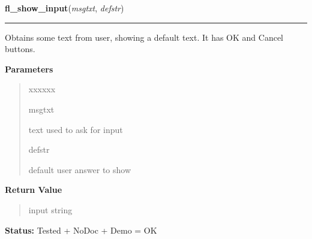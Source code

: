     \label{xformslib:flgoodies:fl_show_input}

    \vspace{0.5ex}

\hspace{.8\funcindent}\begin{boxedminipage}{\funcwidth}

    \raggedright \textbf{fl\_show\_input}(\textit{msgtxt}, \textit{defstr})

    \vspace{-1.5ex}

    \rule{\textwidth}{0.5\fboxrule}
\setlength{\parskip}{2ex}
    Obtains some text from user, showing a default text. It has OK and 
    Cancel buttons.

\setlength{\parskip}{1ex}
      \textbf{Parameters}
      \vspace{-1ex}

      \begin{quote}
        \begin{Ventry}{xxxxxx}

          \item[msgtxt]

          text used to ask for input

          \item[defstr]

          default user answer to show

        \end{Ventry}

      \end{quote}

      \textbf{Return Value}
    \vspace{-1ex}

      \begin{quote}
      input string

      \end{quote}

\textbf{Status:} Tested + NoDoc + Demo = OK



    \end{boxedminipage}

    \label{xformslib:flgoodies:fl_hide_input}


